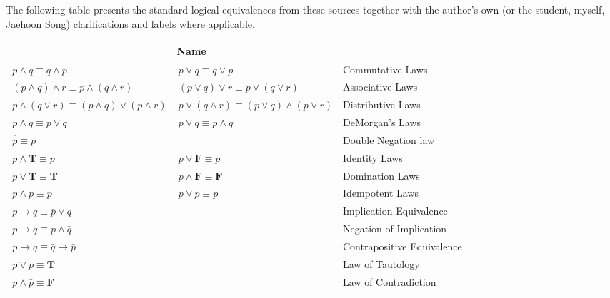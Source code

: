 The following table presents the standard logical equivalences from these sources together with 
the author's own (or the student, myself, Jaehoon Song) clarifications and labels where applicable.


\begin{table}[h!]
  \centering
  \renewcommand{\arraystretch}{1.2}
  \setlength{\tabcolsep}{8pt}
  \begin{tabular}{|p{5.0cm}|p{5.0cm}|p{5.2cm}|}
    \hline
    \rowcolor[HTML]{E0E0E0}
    \multicolumn{2}{|l|}{\textbf{Logical Equivalences}} & \textbf{Name} \\
    \hline
    $\,p \wedge q \equiv q \wedge p$ & $\,p \vee q \equiv q \vee p$ & Commutative Laws \\
    \hline
    $\, (p \wedge q) \wedge r \equiv p \wedge (q \wedge r)$ & $\, (p \vee q) \vee r \equiv p \vee (q \vee r)$ & Associative Laws \\
    \hline
    $\,p \wedge (q \vee r) \equiv (p \wedge q) \vee (p \wedge r)$ & $\,p \vee (q \wedge r) \equiv (p \vee q) \wedge (p \vee r)$ & Distributive Laws \\
    \hline
    $\,\overline{p \wedge q} \equiv \bar{p} \vee \bar{q}$ & $\,\overline{p \vee q} \equiv \bar{p} \wedge \bar{q}$ & DeMorgan's Laws \\
    \hline
    \multicolumn{2}{|l|}{$\,\overline{\overline{p}} \equiv p$} & Double Negation law \\
    \hline
    $\,p \wedge \boldsymbol{T} \equiv p$ & $\,p \vee \boldsymbol{F} \equiv p$ & Identity Laws \\
    \hline
    $\,p \vee \boldsymbol{T} \equiv \boldsymbol{T}$ & $\,p \wedge \boldsymbol{F} \equiv \boldsymbol{F}$ & Domination Laws \\
    \hline
    $\,p \wedge p \equiv p$ & $\,p \vee p \equiv p$ & Idempotent Laws \\
    \hline
    \multicolumn{2}{|l|}{$\,p \rightarrow q \equiv \bar{p} \vee q$} & Implication Equivalence \\
    \hline
    \multicolumn{2}{|l|}{$\,\overline{p \rightarrow q} \equiv p \wedge \bar{q}$} & Negation of Implication \\
    \hline
    \multicolumn{2}{|l|}{$\,p \rightarrow q \equiv \bar{q} \rightarrow \bar{p}$} & Contrapositive Equivalence \\
    \hline
    \multicolumn{2}{|l|}{$\,p \vee \bar{p} \equiv \boldsymbol{T}$} & Law of Tautology \\
    \hline
    \multicolumn{2}{|l|}{$\,p \wedge \bar{p} \equiv \boldsymbol{F}$} & Law of Contradiction \\
    \hline
  \end{tabular}
\end{table}

